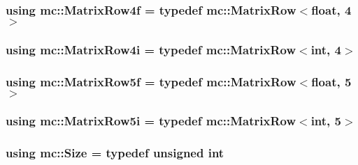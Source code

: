 \subsubsection[{\texorpdfstring{Matrix\+Row4f}{MatrixRow4f}}]{\setlength{\rightskip}{0pt plus 5cm}using {\bf mc\+::\+Matrix\+Row4f} = typedef {\bf mc\+::\+Matrix\+Row}$<$float, 4$>$}\hypertarget{namespacemc_ac76f1616fbf0b724f9a8b957b2635475}{}\label{namespacemc_ac76f1616fbf0b724f9a8b957b2635475}
\subsubsection[{\texorpdfstring{Matrix\+Row4i}{MatrixRow4i}}]{\setlength{\rightskip}{0pt plus 5cm}using {\bf mc\+::\+Matrix\+Row4i} = typedef {\bf mc\+::\+Matrix\+Row}$<${\bf int}, 4$>$}\hypertarget{namespacemc_ae0265bef81dbac954f173a2408c9ce60}{}\label{namespacemc_ae0265bef81dbac954f173a2408c9ce60}
\subsubsection[{\texorpdfstring{Matrix\+Row5f}{MatrixRow5f}}]{\setlength{\rightskip}{0pt plus 5cm}using {\bf mc\+::\+Matrix\+Row5f} = typedef {\bf mc\+::\+Matrix\+Row}$<$float, 5$>$}\hypertarget{namespacemc_a2dc58d627f7c4287360df5a1852050d4}{}\label{namespacemc_a2dc58d627f7c4287360df5a1852050d4}
\subsubsection[{\texorpdfstring{Matrix\+Row5i}{MatrixRow5i}}]{\setlength{\rightskip}{0pt plus 5cm}using {\bf mc\+::\+Matrix\+Row5i} = typedef {\bf mc\+::\+Matrix\+Row}$<${\bf int}, 5$>$}\hypertarget{namespacemc_a458456087c23e1a0463a13c566050b0b}{}\label{namespacemc_a458456087c23e1a0463a13c566050b0b}
\subsubsection[{\texorpdfstring{Size}{Size}}]{\setlength{\rightskip}{0pt plus 5cm}using {\bf mc\+::\+Size} = typedef unsigned {\bf int}}\hypertarget{namespacemc_ad1c06461067735b3b17e0df612532c4e}{}\label{namespacemc_ad1c06461067735b3b17e0df612532c4e}

